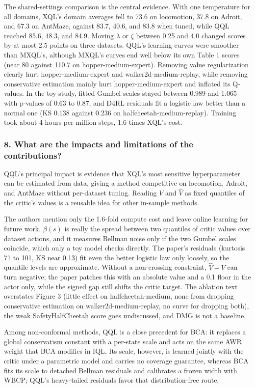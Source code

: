 \documentclass[11pt]{article}
\newcommand{\question}[1]{\subsubsection*{#1}}
\begin{document}
The shared-settings comparison is the central evidence. With one temperature for all domains, XQL's domain averages fell to 73.6 on locomotion, 37.8 on Adroit, and 67.3 on AntMaze, against 83.7, 40.6, and 83.8 when tuned, while QQL reached 85.6, 48.3, and 84.9. Moving \ensuremath{\lambda} or \ensuremath{\zeta} between 0.25 and 4.0 changed scores by at most 2.5 points on three datasets. QQL's learning curves were smoother than MXQL's, although MXQL's curves end well below its own Table 1 scores (near 80 against 110.7 on hopper-medium-expert). Removing value regularization clearly hurt hopper-medium-expert and walker2d-medium-replay, while removing conservative estimation mainly hurt hopper-medium-expert and inflated its Q-values. In the toy study, fitted Gumbel scales stayed between 0.989 and 1.065 with p-values of 0.63 to 0.87, and D4RL residuals fit a logistic law better than a normal one (KS 0.138 against 0.236 on halfcheetah-medium-replay). Training took about 4 hours per million steps, 1.6 times XQL's cost.

\question{8. What are the impacts and limitations of the contributions?}

QQL's principal impact is evidence that XQL's most sensitive hyperparameter can be estimated from data, giving a method competitive on locomotion, Adroit, and AntMaze without per-dataset tuning. Reading $V$ and $\hat{V}$ as fixed quantiles of the critic's values is a reusable idea for other in-sample methods.

The authors mention only the 1.6-fold compute cost and leave online learning for future work. $\beta(s)$ is really the spread between two quantiles of critic values over dataset actions, and it measures Bellman noise only if the two Gumbel scales coincide, which only a toy model checks directly. The paper's residuals (kurtosis 71 to 101, KS near 0.13) fit even the better logistic law only loosely, so the quantile levels are approximate. Without a non-crossing constraint, $\hat{V} - V$ can turn negative; the paper patches this with an absolute value and a 0.1 floor in the actor only, while the signed gap still shifts the critic target. The ablation text overstates Figure 3 (little effect on halfcheetah-medium, none from dropping conservative estimation on walker2d-medium-replay, no curve for dropping both), the weak SafetyHalfCheetah score goes undiscussed, and DMG is not a baseline.

Among non-conformal methods, QQL is a close precedent for BCA: it replaces a global conservatism constant with a per-state scale and acts on the same AWR weight that BCA modifies in IQL. Its scale, however, is learned jointly with the critic under a parametric model and carries no coverage guarantee, whereas BCA fits its scale to detached Bellman residuals and calibrates a frozen width with WBCP; QQL's heavy-tailed residuals favor that distribution-free route.
\end{document}
